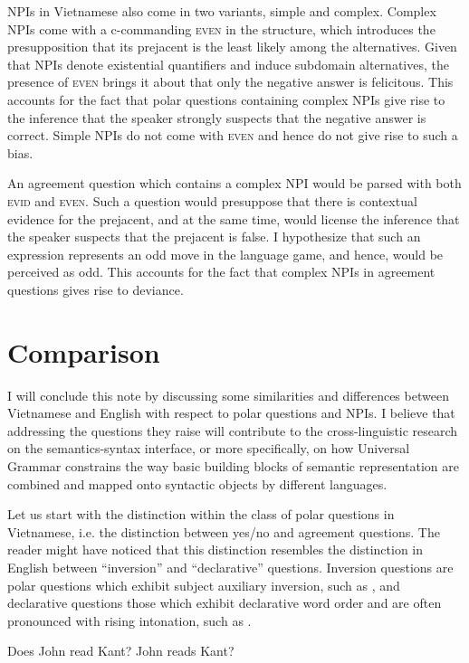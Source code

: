 \documentclass[output=paper,colorlinks,citecolor=brown]{langscibook}
\begin{document}
NPIs in Vietnamese also come in two variants, simple and complex. Complex NPIs come with a c-commanding \textsc{even} in the structure, which introduces the presupposition that its prejacent is the least likely among the alternatives. Given that NPIs denote existential quantifiers and induce subdomain alternatives, the presence of \textsc{even} brings it about that only the negative answer is felicitous. This accounts for the fact that polar questions containing complex NPIs give rise to the inference that the speaker strongly suspects that the negative answer is correct. Simple NPIs do not come with \textsc{even} and hence do not give rise to such a bias.

An agreement question which contains a complex NPI would be parsed with both \textsc{evid} and \textsc{even}. Such a question would presuppose that there is contextual evidence for the prejacent, and at the same time, would license the inference that the speaker suspects that the prejacent is false. I hypothesize that such an expression represents an odd move in the language game, and hence, would be perceived as odd. This accounts for the fact that complex NPIs in agreement questions gives rise to deviance.

\section{Comparison}

I will conclude this note by discussing some similarities and differences between Vietnamese and English with respect to polar questions and NPIs. I believe that addressing the questions they raise will contribute to the cross-linguistic {re\-search} on the semantics-syntax interface, or more specifically, on how Universal Grammar constrains the way basic building blocks of semantic representation are combined and mapped onto syntactic objects by different languages.

Let us start with the distinction within the class of polar questions in Vietnamese, i.e. the distinction between yes/no and agreement questions. The reader might have noticed that this distinction resembles the distinction in English between ``inversion'' and ``declarative'' questions. Inversion questions are polar questions which exhibit subject auxiliary inversion, such as , and declarative questions  those which exhibit declarative word order and are often pronounced with rising intonation, such as .

\ea
\ea\label{subjauxex}
Does John read Kant?
\ex\label{declqex}
John reads Kant?
\z
\z
\end{document}
